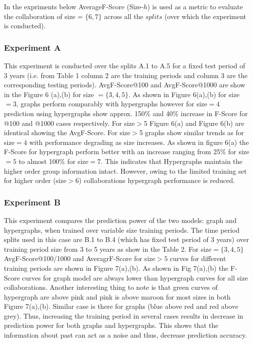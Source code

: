 \documentclass{sig-alternate}
\begin{document}
In the expriments below AverageF-Score (Size-$h$) is used as a metric to evaluate the collaboration of size = $\{6,7\}$ across all the $splits$ (over which the experiment is conducted).

\subsubsection{Experiment A}

This experiment is conducted over the splits A.1 to A.5 for a fixed test period of 3 years (i.e. from Table 1 column 2 are the training periods and column 3 are the corresponding testing periods). AvgF-Score@100 and AvgF-Score@1000 are show in the Figure 6 (a),(b) for size $= \{3,4,5\}$. As shown in Figure 6(a),(b) for size$=3$, graphs perform comparably with hypergraphs however for size$=4$ prediction using hypergraphs show approx. 150\% and 40\% increase in F-Score for @100 and @1000 cases respectively. For size$>$5 Figure 6(a) and Figure 6(b) are identical showing the AvgF-Score. For size$>$5 graphs show similar trends as for size$=4$ with performance degrading as size increases. As shown in figure 6(a) the F-Score for hypergraph perform better with an increase ranging from 25\% for size$=5$ to almost 100\% for size$=7$. This indicates that Hypergraphs maintain the higher order group information intact. However, owing to the limited training set for higher order (size$>6$) collaborations hypergraph performance is reduced. 

\subsubsection{Experiment B}

This experiment compares the prediction power of the two models: graph and hypergraphs, when trained over variable size training periods. The time period splits used in this case are B.1 to B.4 (which has fixed test period of 3 years) over training period size from 3 to 5 years as show in the Table 2. For size$=\{3,4,5\}$ AvgF-Score@100/1000 and AveragrF-Score for size$>5$ curves for different training periods are shown in Figure 7(a),(b). As shown in Fig 7(a),(b) the F-Score curves for graph model are always lower than hypergraph curves for all size collaborations. Another interesting thing to note is that green curves of hypergraph are above pink and pink is above maroon for most sizes in both Figure 7(a),(b). Similar case is there for graphs (blue above red and red above grey). Thus, increasing the training period in several cases results in decrease in prediction power for both graphs and hypergraphs. This shows that the information about past can act as a noise and thus, decrease prediction accuracy.
\end{document}
